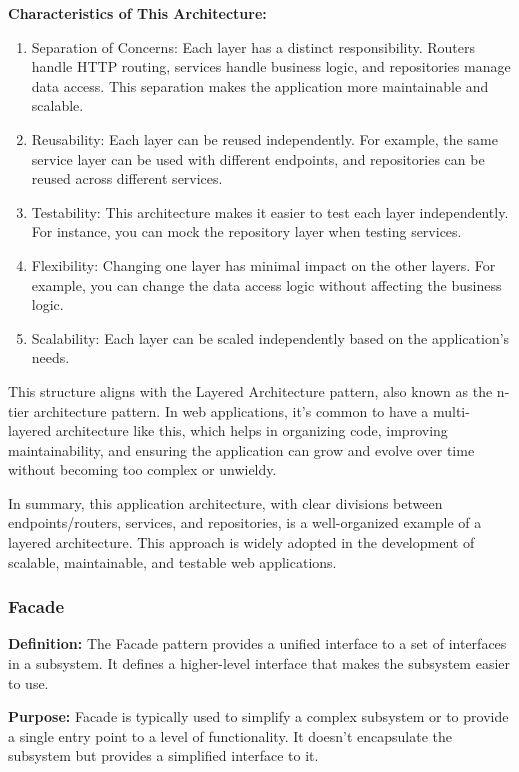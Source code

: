 \textbf{Characteristics of This Architecture:}
\begin{enumerate}
\item Separation of Concerns: Each layer has a distinct responsibility. Routers handle HTTP routing, services handle business logic, and repositories manage data access. This separation makes the application more maintainable and scalable.

\item Reusability: Each layer can be reused independently. For example, the same service layer can be used with different endpoints, and repositories can be reused across different services.

\item Testability: This architecture makes it easier to test each layer independently. For instance, you can mock the repository layer when testing services.

\item Flexibility: Changing one layer has minimal impact on the other layers. For example, you can change the data access logic without affecting the business logic.

\item Scalability: Each layer can be scaled independently based on the application's needs.
\end{enumerate}

This structure aligns with the Layered Architecture pattern, also known as the n-tier architecture pattern. In web applications, it's common to have a multi-layered architecture like this, which helps in organizing code, improving maintainability, and ensuring the application can grow and evolve over time without becoming too complex or unwieldy.

In summary, this application architecture, with clear divisions between endpoints/routers, services, and repositories, is a well-organized example of a layered architecture. This approach is widely adopted in the development of scalable, maintainable, and testable web applications.

\subsubsection{Facade}
\indent \textbf{Definition:} The Facade pattern provides a unified interface to a set of interfaces in a subsystem. It defines a higher-level interface that makes the subsystem easier to use.

\textbf{Purpose:} Facade is typically used to simplify a complex subsystem or to provide a single entry point to a level of functionality. It doesn't encapsulate the subsystem but provides a simplified interface to it.

